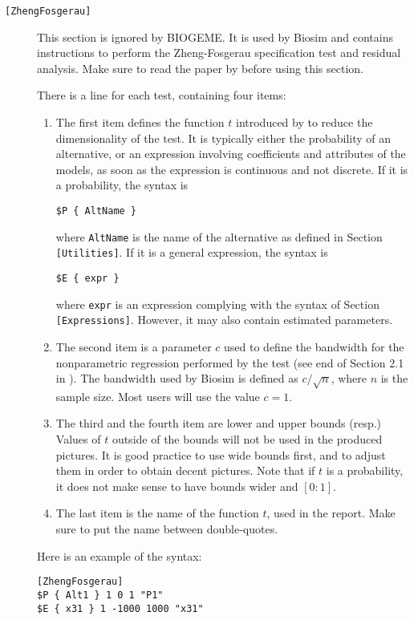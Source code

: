 \documentclass[12pt,a4paper]{article}
\newcommand{\specitem}[1]{\texttt{[#1]}}
\begin{document}
\begin{description}
\item[\specitem{ZhengFosgerau}]  This section is ignored by BIOGEME. It is
      used by Biosim and contains instructions to perform the
Zheng-Fosgerau specification test and residual analysis. Make sure to
read the paper by  before using this section.

There is a line for each test, containing four items:
\begin{enumerate}
\item The first item defines the function $t$ introduced by
 to reduce the dimensionality of the test. It is
typically either the probability of an alternative, or an expression
involving coefficients and attributes of the models, as soon as the
expression is continuous and not discrete. If it is a probability, the
syntax is
\begin{verbatim}
$P { AltName }
\end{verbatim}
where \verb+AltName+ is the name of the alternative as defined in
Section \verb+[Utilities]+. If it is a general
expression, the syntax is 
\begin{verbatim}
$E { expr }
\end{verbatim}
where \texttt{expr} is an expression complying with the syntax of
Section \verb+[Expressions]+. However, it may also
contain estimated parameters. 
\item The second item is a parameter $c$ used to define the bandwidth for the
nonparametric regression performed by the test  (see end of Section
2.1 in \cite{Fosg08}). The bandwidth used by Biosim is defined as
$c/\sqrt{n}$, where $n$ is the sample size. Most users will use the
value $c=1$.
\item The third and the fourth item are lower and upper bounds
(resp.) Values of $t$ outside of the bounds will not be used in the
produced pictures. It is good practice to use wide bounds first, and
to adjust them in order to obtain decent pictures.  Note that if $t$
is a probability, it does not make sense to have bounds wider and $[0:1]$.
\item The last item is the name of the function $t$, used in the
report. Make sure to put the name between double-quotes.
\end{enumerate}
Here is an example of the syntax:
\begin{verbatim}
[ZhengFosgerau]
$P { Alt1 } 1 0 1 "P1"
$E { x31 } 1 -1000 1000 "x31"  
\end{verbatim}


\end{description}
\end{document}
